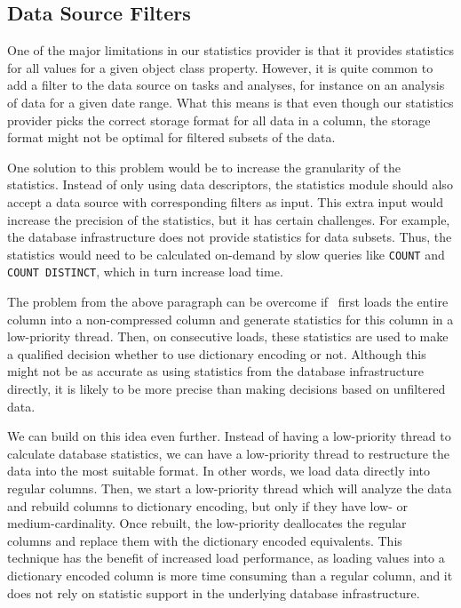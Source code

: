 
\subsection{Data Source Filters}
\label{sub:Data Source Filters}
One of the major limitations in our statistics provider is that it provides statistics for all values for a given object class property. However, it is quite common to add a filter to the data source on tasks and analyses, for instance on an analysis of data for a given date range. What this means is that even though our statistics provider picks the correct storage format for all data in a column, the storage format might not be optimal for filtered subsets of the data.

One solution to this problem would be to increase the granularity of the statistics. Instead of only using data descriptors, the statistics module should also accept a data source with corresponding filters as input. This extra input would increase the precision of the statistics, but it has certain challenges. For example, the database infrastructure does not provide statistics for data subsets. Thus, the statistics would need to be calculated on-demand by slow queries like \texttt{COUNT} and \texttt{COUNT DISTINCT}, which in turn increase load time.

The problem from the above paragraph can be overcome if \gap~first loads the entire column into a non-compressed column and generate statistics for this column in a low-priority thread. Then, on consecutive loads, these statistics are used to make a qualified decision whether to use dictionary encoding or not. Although this might not be as accurate as using statistics from the database infrastructure directly, it is likely to be more precise than making decisions based on unfiltered data. 

We can build on this idea even further. Instead of having a low-priority thread to calculate database statistics, we can have a low-priority thread to restructure the data into the most suitable format. In other words, we load data directly into regular columns. Then, we start a low-priority thread which will analyze the data and rebuild columns to dictionary encoding, but only if they have low- or medium-cardinality. Once rebuilt, the low-priority deallocates the regular columns and replace them with the dictionary encoded equivalents. This technique has the benefit of increased load performance, as loading values into a dictionary encoded column is more time consuming than a regular column, and it does not rely on statistic support in the underlying database infrastructure.


